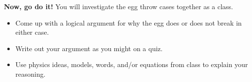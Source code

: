 \noindent\textbf{Now, go do it!} You will investigate the egg throw cases together as a class.

\begin{itemize}
	\item Come up with a logical argument for why the egg does or does not break in either case.
	\item Write out your argument as you might on a quiz.
	\item Use physics ideas, models, words, and/or equations from class to explain your reasoning.
\end{itemize}

\WCD